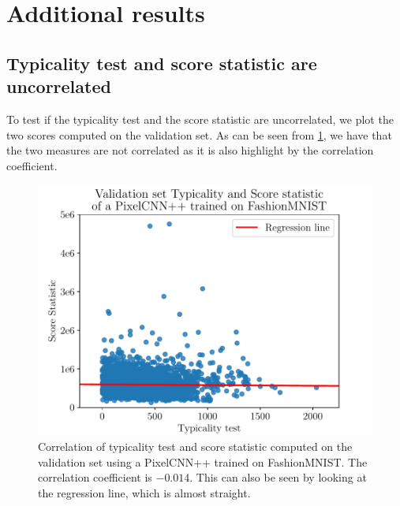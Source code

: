 {\section{Additional results}

\subsection{Typicality test and score statistic are uncorrelated}
\label{appendix_modelagnostic:correlation}
To test if the typicality test and the score statistic are uncorrelated, we plot the two scores computed on the validation set. As can be seen from \cref{fig_modelagnostic:corralation}, we have that the two measures are not correlated as it is also highlight by the correlation coefficient.

\begin{figure}[tb]
    \centering
    \includegraphics[scale=0.5]{graphics/paper_modelagnostic/correlation_correct_font.pdf}
    \caption[Correlation of typicality test and score statistic computed on the validation set using a PixelCNN++ trained on FashionMNIST]{Correlation of typicality test and score statistic computed on the validation set using a PixelCNN++ trained on FashionMNIST. The correlation coefficient is $-0.014$. This can also be seen by looking at the regression line, which is almost straight. }
    \label{fig_modelagnostic:corralation}
\end{figure}


}
